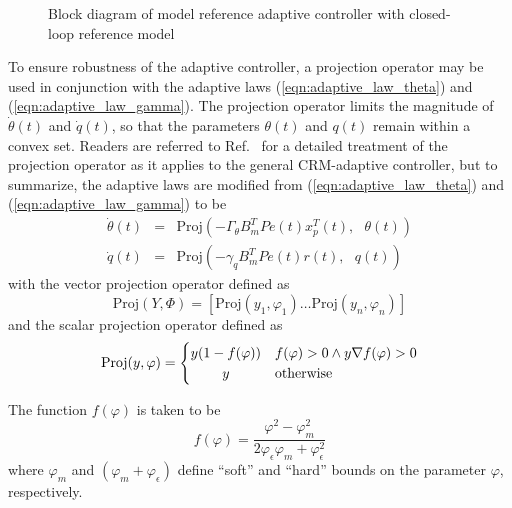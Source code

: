 \begin{figure}[t]

	\caption{Block diagram of model reference adaptive controller with closed-loop reference model}
	\label{fig:mrac_block}
\end{figure}

To ensure robustness of the adaptive controller, a projection operator \cite{pomet1992adaptive, lavretsky2011projection} may be used in conjunction with the adaptive laws (\ref{eqn:adaptive_law_theta}) and (\ref{eqn:adaptive_law_gamma}). The projection operator limits the magnitude of $\dot{\theta}(t)$ and $\dot{q}(t)$, so that the parameters $\theta(t)$ and $q(t)$ remain within a convex set. Readers are referred to Ref.~\cite{gibson2013adaptive} for a detailed treatment of the projection operator as it applies to the general CRM-adaptive controller, but to summarize, the adaptive laws are modified from (\ref{eqn:adaptive_law_theta}) and (\ref{eqn:adaptive_law_gamma}) to be
\begin{eqnarray}
	\dot{\theta}(t) &=& \text{Proj}(- \Gamma_\theta B_m^T P e(t) x_p^T(t),\text{ } \theta(t)) \label{eqn:thetadot_projection} \\
	\dot{q}(t) &=& \text{Proj}(- \gamma_q B_m^T P e(t) r(t),\text{ } q(t)) \label{eqn:qdot_projection}
\end{eqnarray}
\noindent with the vector projection operator defined as
\begin{equation}
	\text{Proj}(Y, \Phi) = \left[ \text{Proj}(y_1, \varphi_1) \ldots \text{Proj}(y_n, \varphi_n) \right]
\end{equation}
\noindent and the scalar projection operator defined as
\begin{equation}
	\text{Proj}(y, \varphi) = \begin{cases}
		y(1 - f(\varphi)) & f(\varphi) > 0 \land y \nabla f(\varphi) > 0\\
		\hfil y & \text{otherwise}
	\end{cases}
\end{equation}

\noindent The function $f(\varphi)$ is taken to be
\begin{equation}
	f(\varphi) = \frac{\varphi^2 - \varphi_{m}^2}{2 \varphi_{\epsilon} \varphi_{m} + \varphi_{\epsilon}^2}
	\label{eqn:proj_function}
\end{equation}
\noindent where $\varphi_{m}$ and $(\varphi_{m} + \varphi_{\epsilon})$ define ``soft'' and ``hard'' bounds on the parameter $\varphi$, respectively. 

